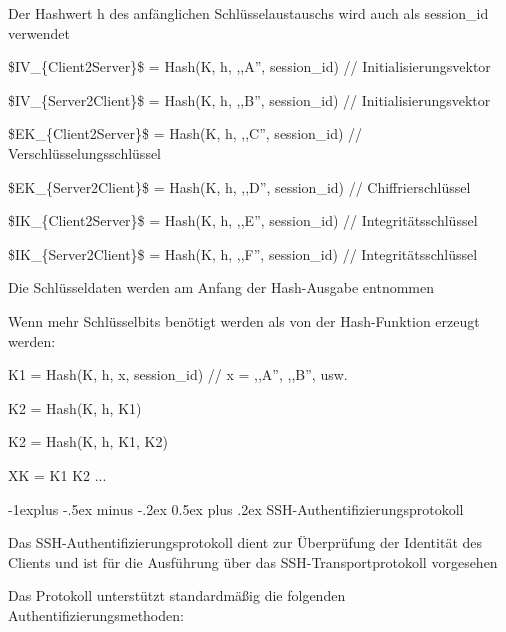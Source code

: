 \documentclass[a4paper]{article}
\makeatletter
\renewcommand{\subsection}{\@startsection{subsection}{2}{0mm}%
 {-1explus -.5ex minus -.2ex}%
 {0.5ex plus .2ex}%
 {\normalfont\normalsize\bfseries}}
\makeatother
\begin{document}
\begin{multicols}{3}
\begin{itemize*}
\begin{itemize*}
                  \begin{itemize*}
                        \item Der Hashwert h des anfänglichen Schlüsselaustauschs wird auch als session\_id verwendet
                        \item \$IV\_\{Client2Server\}\$ = Hash(K, h, ,,A'', session\_id) // Initialisierungsvektor
                        \item \$IV\_\{Server2Client\}\$ = Hash(K, h, ,,B'', session\_id) // Initialisierungsvektor
                        \item \$EK\_\{Client2Server\}\$ = Hash(K, h, ,,C'', session\_id) // Verschlüsselungsschlüssel
                        \item \$EK\_\{Server2Client\}\$ = Hash(K, h, ,,D'', session\_id) // Chiffrierschlüssel
                        \item \$IK\_\{Client2Server\}\$ = Hash(K, h, ,,E'', session\_id) // Integritätsschlüssel
                        \item \$IK\_\{Server2Client\}\$ = Hash(K, h, ,,F'', session\_id) // Integritätsschlüssel
                  \end{itemize*}
                  \item
                  Die Schlüsseldaten werden am Anfang der Hash-Ausgabe entnommen
                  \item
                  Wenn mehr Schlüsselbits benötigt werden als von der Hash-Funktion
                  erzeugt werden:

                  \begin{itemize*}
                        \item K1 = Hash(K, h, x, session\_id) // x = ,,A'', ,,B'', usw.
                        \item K2 = Hash(K, h, K1)
                        \item K2 = Hash(K, h, K1, K2)
                        \item XK = K1 \textbar\textbar{} K2 \textbar\textbar{} ...
                  \end{itemize*}
            \end{itemize*}


            \subsection{SSH-Authentifizierungsprotokoll}

            \begin{itemize*}
                  \item
                  Das SSH-Authentifizierungsprotokoll dient zur Überprüfung der
                  Identität des Clients und ist für die Ausführung über das
                  SSH-Transportprotokoll vorgesehen
                  \item
                  Das Protokoll unterstützt standardmäßig die folgenden
                  Authentifizierungsmethoden:


\end{itemize*}
\end{itemize*}
\end{multicols}
\end{document}
